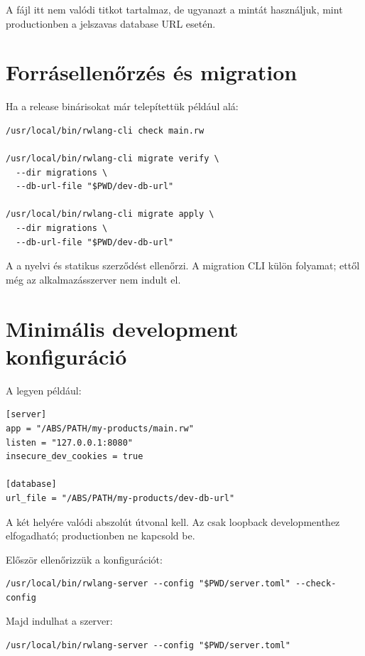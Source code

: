 A fájl itt nem valódi titkot tartalmaz, de ugyanazt a  mintát használjuk, mint productionben a jelszavas database URL esetén.

\section{Forrásellenőrzés és migration}

Ha a release binárisokat már telepítettük például  alá:

\begin{lstlisting}
/usr/local/bin/rwlang-cli check main.rw

/usr/local/bin/rwlang-cli migrate verify \
  --dir migrations \
  --db-url-file "$PWD/dev-db-url"

/usr/local/bin/rwlang-cli migrate apply \
  --dir migrations \
  --db-url-file "$PWD/dev-db-url"
\end{lstlisting}

A \code{check} a nyelvi és statikus szerződést ellenőrzi. A migration CLI külön folyamat; ettől még az alkalmazásszerver nem indult el.

\section{Minimális development konfiguráció}

A \code{server.toml} legyen például:

\begin{lstlisting}
[server]
app = "/ABS/PATH/my-products/main.rw"
listen = "127.0.0.1:8080"
insecure_dev_cookies = true

[database]
url_file = "/ABS/PATH/my-products/dev-db-url"
\end{lstlisting}

A két  helyére valódi abszolút útvonal kell. Az  csak loopback developmenthez elfogadható; productionben ne kapcsold be.

Először ellenőrizzük a konfigurációt:

\begin{lstlisting}
/usr/local/bin/rwlang-server --config "$PWD/server.toml" --check-config
\end{lstlisting}

Majd indulhat a szerver:

\begin{lstlisting}
/usr/local/bin/rwlang-server --config "$PWD/server.toml"
\end{lstlisting}

